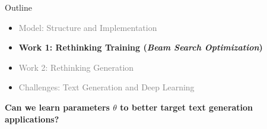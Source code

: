 \begin{frame}{Outline}

  \begin{itemize}
  \item \textcolor{gray}{Model: Structure and Implementation}
    \air
  \item \textbf{Work 1: Rethinking Training (\textit{Beam Search Optimization})}
    \air

  \item \textcolor{gray}{Work 2: Rethinking Generation}
    \air

  \item \textcolor{gray}{Challenges: Text Generation and Deep Learning}
  \end{itemize}

  \begin{center}
    \textbf{Can we learn parameters $\theta$ to better target text generation
    applications?}
  \end{center}


\end{frame}











